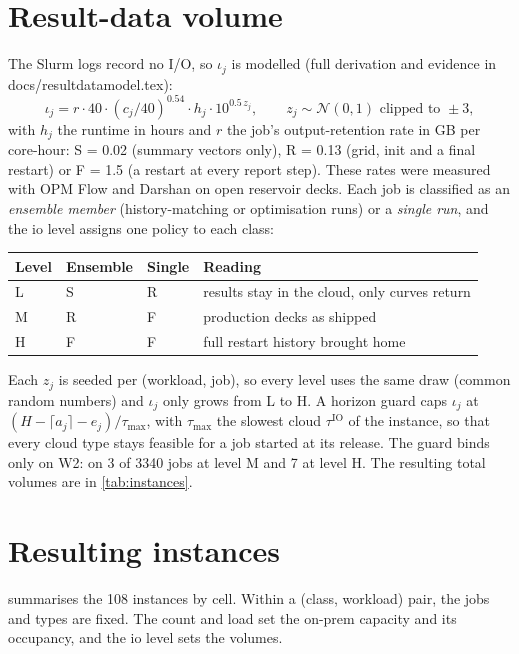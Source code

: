 \documentclass[11pt,a4paper]{article}
\newcommand{\ioVol}{\iota_j}
\newcommand{\tauIO}{\tau^{\mathrm{IO}}}
\newcommand{\codeus}{\textunderscore\allowbreak}
\newcommand{\code}[1]{{\ttfamily\let\_\codeus #1}}
\begin{document}
\section{Result-data volume}\label{sec:io}
The Slurm logs record no I/O, so $\ioVol$ is modelled (full derivation and
evidence in \code{docs/result\_data\_model.tex}):
\begin{equation}
  \ioVol = r \cdot 40 \cdot (c_j/40)^{0.54} \cdot h_j \cdot 10^{0.5\,z_j},
  \qquad z_j\sim\mathcal N(0,1)\text{ clipped to }\pm3,
\end{equation}
with $h_j$ the runtime in hours and $r$ the job's output-retention rate in GB per
core-hour: S = 0.02 (summary vectors only), R = 0.13 (grid, init and a final
restart) or F = 1.5 (a restart at every report step). These rates were measured
with OPM Flow and Darshan on open reservoir decks. Each job is classified as an
\emph{ensemble member} (history-matching or optimisation runs) or a \emph{single
run}, and the io level assigns one policy to each class:
\begin{center}\small
\begin{tabular}{llll}
\toprule
Level & Ensemble & Single & Reading \\
\midrule
L & S & R & results stay in the cloud, only curves return \\
M & R & F & production decks as shipped \\
H & F & F & full restart history brought home \\
\bottomrule
\end{tabular}
\end{center}
Each $z_j$ is seeded per (workload, job), so every level uses the same draw (common
random numbers) and $\ioVol$ only grows from L to H. A horizon guard caps
$\ioVol$ at $(H-\lceil a_j\rceil-e_j)/\tau_{\max}$, with $\tau_{\max}$ the slowest
cloud $\tauIO$ of the instance, so that every cloud type stays feasible for a job
started at its release. The guard binds only on W2: on 3 of \num{3340}
jobs at level M and 7 at level H. The resulting total volumes are in
\cref{tab:instances}.

\section{Resulting instances}\label{sec:instances}
 summarises the 108 instances by cell. Within a
(class, workload) pair, the jobs and types are fixed. The count and load set the
on-prem capacity and its occupancy, and the io level sets the volumes.
\end{document}
